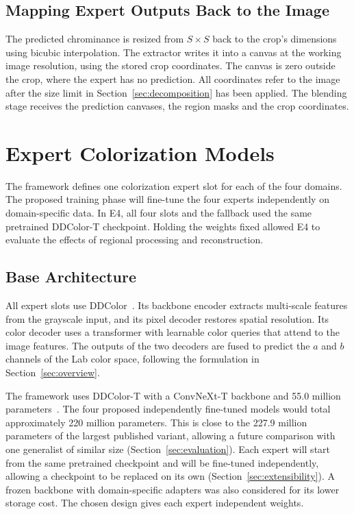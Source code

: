 \documentclass{FastFyp}
\begin{document}
\subsection{Mapping Expert Outputs Back to the Image}
\label{sec:placement}

The predicted chrominance is resized from $S\times S$ back to the crop's
dimensions using bicubic interpolation. The extractor writes it into a canvas
at the working image resolution, using the stored crop coordinates. The
canvas is zero outside the crop, where the expert has no prediction. All
coordinates refer to the image after the size limit in
Section~\ref{sec:decomposition} has been applied. The blending stage receives
the prediction canvases, the region masks and the crop coordinates.

\section{Expert Colorization Models}
\label{sec:experts}

The framework defines one colorization expert slot for each of the four
domains. The proposed training phase will fine-tune the four experts
independently on domain-specific data. In E4, all four slots and the fallback
used the same pretrained DDColor-T checkpoint. Holding the weights fixed
allowed E4 to evaluate the effects of regional processing and reconstruction.

\subsection{Base Architecture}

All expert slots use DDColor~\cite{ref9}. Its backbone encoder extracts
multi-scale features from the grayscale input, and its pixel decoder
restores spatial resolution. Its color decoder uses a transformer with
learnable color queries that attend to the image features. The outputs of
the two decoders are fused to predict the $a$ and $b$ channels of the Lab
color space, following the formulation in Section~\ref{sec:overview}.

The framework uses DDColor-T with a ConvNeXt-T backbone and 55.0 million
parameters~\cite{ref9,ref10}. The four proposed independently fine-tuned
models would total approximately 220 million parameters. This is close to
the 227.9 million parameters of the largest published variant, allowing
a future comparison with one generalist of similar size
(Section~\ref{sec:evaluation}). Each expert will start from the same
pretrained checkpoint and will be fine-tuned independently, allowing a
checkpoint to be replaced on its own (Section~\ref{sec:extensibility}).
A frozen backbone with domain-specific adapters was also considered for its
lower storage cost. The chosen design gives each expert independent weights.
\end{document}

